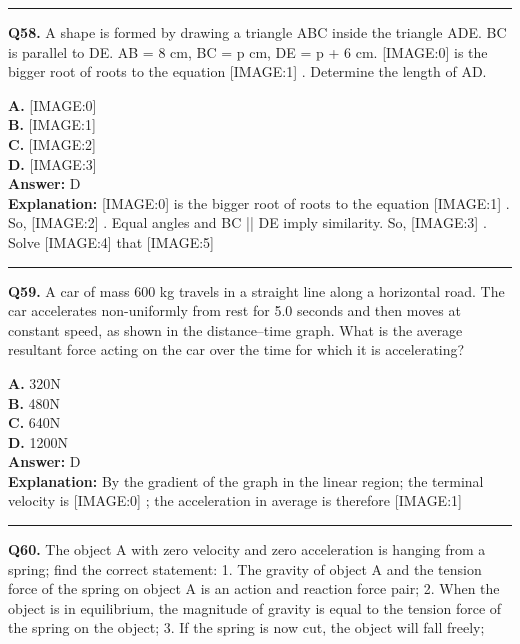 \documentclass[12pt]{article}
\begin{document}
\hrule
\vspace{1em}


\noindent
\textbf{Q58.} A shape is formed by drawing a triangle ABC inside the triangle ADE. BC is parallel to DE. AB = 8 cm, BC = p cm, DE = p + 6 cm.
[IMAGE:0]
is the bigger root of roots to the equation
[IMAGE:1]
.
Determine the length of AD.



\textbf{A.} [IMAGE:0] \\
\textbf{B.} [IMAGE:1] \\
\textbf{C.} [IMAGE:2] \\
\textbf{D.} [IMAGE:3] \\

\textbf{Answer:} D \\
\textbf{Explanation:} [IMAGE:0]
is the bigger root of roots to the equation
[IMAGE:1]
. So,
[IMAGE:2]
.
Equal angles and BC || DE imply similarity. So,
[IMAGE:3]
. Solve
[IMAGE:4]
that
[IMAGE:5]

\hrule
\vspace{1em}


\noindent
\textbf{Q59.} A car of mass 600 kg travels in a straight line along a horizontal road.
The car accelerates non-uniformly from rest for 5.0 seconds and then moves at constant speed, as shown in the distance–time graph.
What is the average resultant force acting on the car over the time for which it is accelerating?



\textbf{A.} 320N \\
\textbf{B.} 480N \\
\textbf{C.} 640N \\
\textbf{D.} 1200N \\

\textbf{Answer:} D \\
\textbf{Explanation:} By the gradient of the graph in the linear region; the terminal velocity is
[IMAGE:0]
; the acceleration in average is therefore
[IMAGE:1]

\hrule
\vspace{1em}


\noindent
\textbf{Q60.} The object A with zero velocity and zero acceleration is hanging from a spring; find the correct statement:
1.
The gravity of object A and the tension force of the spring on object A is an action and reaction force pair;
2.
When the object is in equilibrium, the magnitude of gravity is equal to the tension force of the spring on the object;
3.
If the spring is now cut, the object will fall freely;
\end{document}
